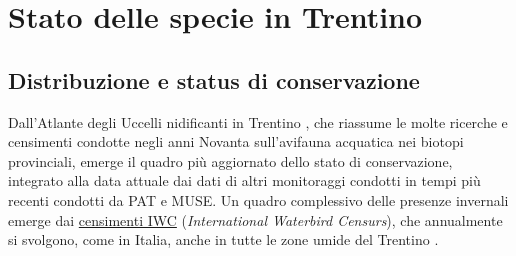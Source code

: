 \documentclass[10pt,twoside,openany,x11names,svgnames,italian,a5paper,dvipsnames,table]{memoir}
\newcommand\chapterillustration{}
\begin{document}
\hiderowcolors
\begin{table}[H]
\centering
{}
\end{table}
\newpage



  
\setlength\afterchapskip{55mm}
\chapter{Stato delle specie in Trentino}
\renewcommand\chapterillustration{4.jpg}


\section{Distribuzione e status di conservazione}
Dall’Atlante degli Uccelli nidificanti in Trentino \cite{Pedrini05}, che riassume le molte ricerche e censimenti condotte negli anni Novanta sull’avifauna acquatica nei biotopi provinciali, emerge il quadro più aggiornato dello stato di conservazione, integrato alla data attuale dai dati di altri monitoraggi condotti in tempi più recenti condotti da PAT e MUSE. Un quadro complessivo delle presenze invernali emerge dai \href{http://www.isprambiente.gov.it/it/temi/biodiversita/lispra-e-la-biodiversita/attivita-e-progetti/progetto-iwc-italia}{censimenti IWC} (\emph{International Waterbird Censurs}), che annualmente si svolgono, come in Italia, anche in tutte le zone umide del Trentino \cite{Pedrini12}.
\end{document}
